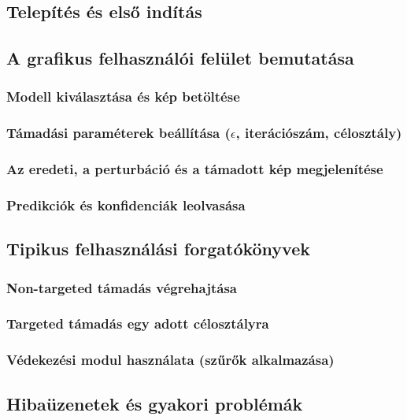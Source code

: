 \documentclass[12pt,a4paper]{article}
\begin{document}
\subsection{Telepítés és első indítás}

\subsection{A grafikus felhasználói felület bemutatása}

\subsubsection{Modell kiválasztása és kép betöltése}

\subsubsection{Támadási paraméterek beállítása ($\epsilon$, iterációszám, célosztály)}

\subsubsection{Az eredeti, a perturbáció és a támadott kép megjelenítése}

\subsubsection{Predikciók és konfidenciák leolvasása}

\subsection{Tipikus felhasználási forgatókönyvek}

\subsubsection{Non-targeted támadás végrehajtása}

\subsubsection{Targeted támadás egy adott célosztályra}

\subsubsection{Védekezési modul használata (szűrők alkalmazása)}

\subsection{Hibaüzenetek és gyakori problémák}
\end{document}
